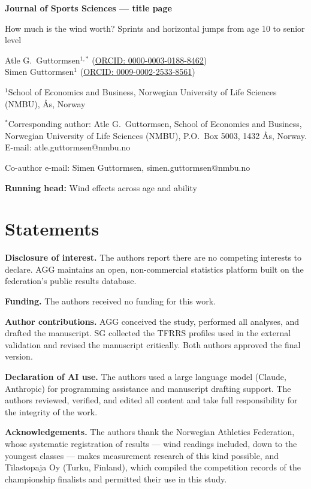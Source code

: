 \documentclass[12pt,a4paper]{article}
\begin{document}
\noindent\textbf{Journal of Sports Sciences --- title page}

\bigskip
{\noindent\Large\bfseries\raggedright{} How much is the wind worth? Sprints and horizontal jumps from age 10 to senior level\par}

\bigskip
{\noindent\large
Atle G.\ Guttormsen$^{1,*}$ (\href{https://orcid.org/0000-0003-0188-8462}{ORCID: 0000-0003-0188-8462}) \\
Simen Guttormsen$^{1}$ (\href{https://orcid.org/0009-0002-2533-8561}{ORCID: 0009-0002-2533-8561})
}

\medskip
{\noindent
$^1$School of Economics and Business, Norwegian University of Life Sciences (NMBU), Ås, Norway
}

\medskip
{\noindent
$^*$Corresponding author: Atle G.\ Guttormsen, School of Economics and Business, Norwegian University of Life Sciences (NMBU), P.O.\ Box 5003, 1432 Ås, Norway.\\ E-mail: atle.guttormsen@nmbu.no
}

\medskip
{\noindent
Co-author e-mail: Simen Guttormsen, simen.guttormsen@nmbu.no
}

\medskip
{\noindent\textbf{Running head:} Wind effects across age and ability}

\section*{Statements}

\noindent\textbf{Disclosure of interest.} The authors report there are no competing interests to declare. AGG maintains an open, non-commercial statistics platform built on the federation's public results database.

\medskip\noindent\textbf{Funding.} The authors received no funding for this work.

\medskip\noindent\textbf{Author contributions.} AGG conceived the study, performed all analyses, and drafted the manuscript. SG collected the TFRRS profiles used in the external validation and revised the manuscript critically. Both authors approved the final version.

\medskip\noindent\textbf{Declaration of AI use.} The authors used a large language model (Claude, Anthropic) for programming assistance and manuscript drafting support. The authors reviewed, verified, and edited all content and take full responsibility for the integrity of the work.

\medskip\noindent\textbf{Acknowledgements.} The authors thank the Norwegian Athletics Federation, whose systematic registration of results --- wind readings included, down to the youngest classes --- makes measurement research of this kind possible, and Tilastopaja Oy (Turku, Finland), which compiled the competition records of the championship finalists and permitted their use in this study.
\end{document}

